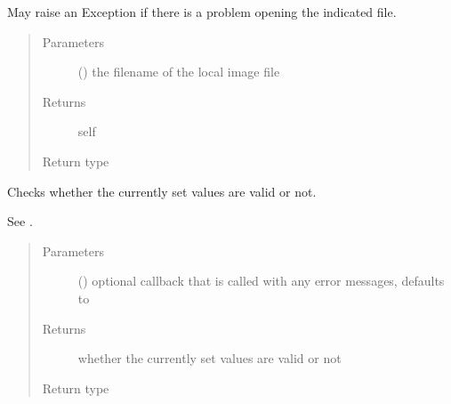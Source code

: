 \documentclass[letterpaper,10pt,english]{sphinxmanual}
\begin{document}
\begin{fulllineitems}
\begin{fulllineitems}
May raise an Exception if there is a problem opening the indicated file.
\begin{quote}\begin{description}
\item[{Parameters}] \leavevmode
{} () \textendash{} the filename of the local image file

\item[{Returns}] \leavevmode
self

\item[{Return type}] \leavevmode
{\hyperref[\detokenize{autoapi/pine/client/models/index:pine.client.models.CollectionBuilder}]{}}

\end{description}\end{quote}

\end{fulllineitems}


\begin{fulllineitems}
\label{\detokenize{autoapi/pine/client/index:pine.client.CollectionBuilder.is_valid}}
Checks whether the currently set values are valid or not.

See {\hyperref[\detokenize{autoapi/pine/client/models/index:pine.client.models.is_valid_collection}]{}}.
\begin{quote}\begin{description}
\item[{Parameters}] \leavevmode
{} (\sphinxstyleliteralemphasis{\sphinxupquote{, }}) \textendash{} optional callback that is called with any error messages, defaults to 

\item[{Returns}] \leavevmode
whether the currently set values are valid or not

\item[{Return type}] \leavevmode
{}

\end{description}\end{quote}

\end{fulllineitems}


\end{fulllineitems}
\end{document}
